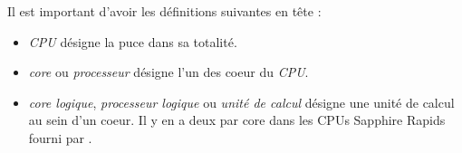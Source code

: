 Il est important d'avoir les définitions suivantes en tête :
\begin{itemize}
  \item \emph{CPU} désigne la puce dans sa totalité.
  \item \emph{core} ou \emph{processeur} désigne l'un des coeur du \emph{CPU}.
  \item \emph{core logique}, \emph{processeur logique} ou \emph{unité de calcul} %
  désigne une unité de calcul au sein d'un coeur. Il y en a deux par core dans les CPUs \intel{} Sapphire Rapids fourni par \atos{}.
\end{itemize}
